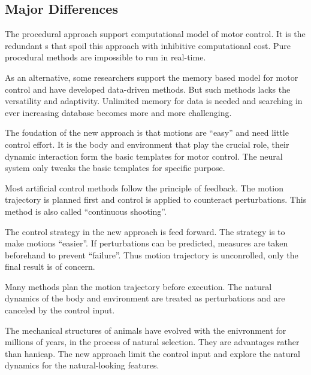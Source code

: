 \subsection{Major Differences}
\begin{itemize}
The procedural approach support computational model of motor control.
It is the redundant {\dof}s that spoil this approach  with inhibitive computational cost.
Pure procedural methods are impossible to run in real-time.

As an alternative, some researchers support the memory based model for motor control and have developed data-driven methods.
But such methods lacks the versatility and adaptivity.
Unlimited memory for data is needed and searching in ever increasing database becomes more and more challenging.

The foudation of the new approach is that motions are ``easy'' and need little control effort.
It is the body and environment that play the crucial role, their dynamic interaction form the basic templates for motor control.
The neural system only tweaks the basic templates for specific purpose.



 
 
	
Most artificial control methods follow the principle of feedback.
The motion trajectory is planned first and control is applied to counteract perturbations.
This method is also called ``continuous shooting''.


The control strategy in the new approach is feed forward.
The strategy is to make motions ``easier''.
If perturbations can be predicted, measures are taken beforehand to prevent ``failure''.
Thus motion trajectory is unconrolled, only the final result is of concern.


Many \cms methods plan the motion trajectory before execution.
The natural dynamics of the body and environment are treated as perturbations and are canceled by the control input.


The mechanical structures of animals have evolved with the enivronment for millions of years, in the process of natural selection.
They are advantages rather than hanicap. 
The new approach limit the control input and explore the natural dynamics for the natural-looking features.
\end{itemize}



